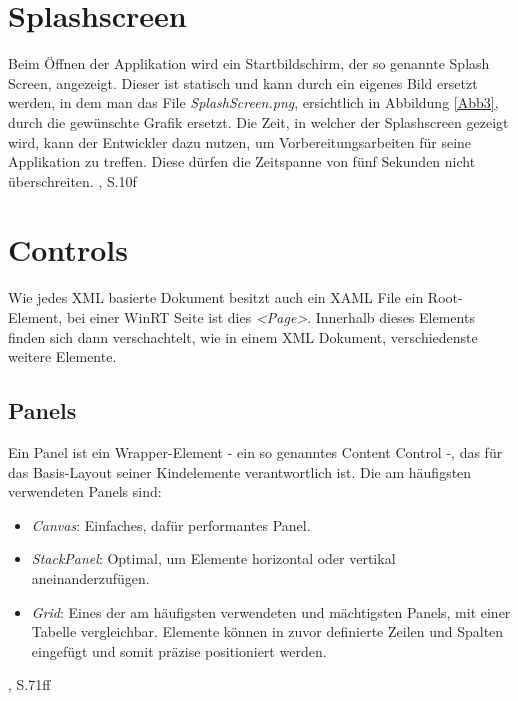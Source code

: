 \documentclass[a4paper,bibtotoc,oneside]{scrbook}
\begin{document}
\section[Splash Screen]{Splashscreen}
Beim Öffnen der Applikation wird ein Startbildschirm, der so genannte Splash Screen, angezeigt. Dieser ist statisch und kann durch ein eigenes Bild ersetzt werden, in dem man das File \textit{SplashScreen.png}, ersichtlich in Abbildung \ref{Abb3}, durch die gewünschte Grafik ersetzt.
\newline
Die Zeit, in welcher der Splashscreen gezeigt wird, kann der Entwickler dazu nutzen, um Vorbereitungsarbeiten für seine Applikation zu treffen. Diese dürfen die Zeitspanne von fünf Sekunden nicht überschreiten.
\cite{ana12}, S.10f

\section[Controls]{Controls}\label{ref:controls}
Wie jedes XML basierte Dokument besitzt auch ein XAML File ein Root-Element, bei einer WinRT Seite ist dies \textit{<Page>}. Innerhalb dieses Elements finden sich dann verschachtelt, wie in einem XML Dokument, verschiedenste weitere Elemente.
\newline
\subsection[Panels]{Panels}\label{ref:panels}
Ein Panel ist ein Wrapper-Element - ein so genanntes Content Control -, das für das Basis-Layout seiner Kindelemente verantwortlich ist.
\newline
Die am häufigsten verwendeten Panels sind:
\begin{itemize}
\item \textit{Canvas}:
\newline
Einfaches, dafür performantes Panel.
\item \textit{StackPanel}:
\newline
Optimal, um Elemente horizontal oder vertikal aneinanderzufügen.
\item \textit{Grid}:
Eines der am häufigsten verwendeten und mächtigsten Panels, mit einer Tabelle vergleichbar.
\newline
Elemente können in zuvor definierte Zeilen und Spalten eingefügt und somit präzise positioniert werden.
\end{itemize}
\cite{ana12}, S.71ff
\end{document}
